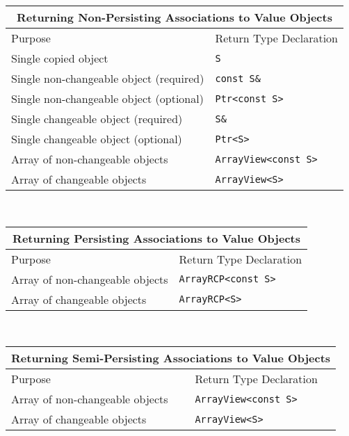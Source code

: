 \begin{tabular}{|l|l|}
%
\multicolumn{2}{c}{\textbf{Returning Non-Persisting Associations to Value Objects}} \\
%
\hline
Purpose
& Return Type Declaration \\
\hline
\hline
Single copied object
& {}\texttt{S} \\
\hline
Single non-changeable object (required)
& {}\texttt{const S\&} \\
\hline
Single non-changeable object (optional)
& {}\texttt{Ptr<const S>} \\
\hline
Single changeable object (required)
& {}\texttt{S\&} \\
\hline
Single changeable object (optional)
& {}\texttt{Ptr<S>} \\
\hline
Array of non-changeable objects
& {}\texttt{ArrayView<const S>} \\
\hline
Array of changeable objects
& {}\texttt{ArrayView<S>} \\
\hline
%
\end{tabular} \\[3ex]
%
\begin{tabular}{|l|l|}
%
\multicolumn{2}{c}{\textbf{Returning Persisting Associations to Value Objects}} \\
%
\hline
Purpose
& Return Type Declaration \\
\hline
\hline
Array of non-changeable objects
& {}\texttt{ArrayRCP<const S>} \\
\hline
Array of changeable objects
& {}\texttt{ArrayRCP<S>} \\
\hline
\end{tabular} \\[3ex]
%
\begin{tabular}{|l|l|}
%
\multicolumn{2}{c}{\textbf{Returning Semi-Persisting Associations to Value Objects}} \\
%
\hline
Purpose
& Return Type Declaration \\
\hline
\hline
Array of non-changeable objects
& {}\texttt{ArrayView<const S>} \\
\hline
Array of changeable objects
& {}\texttt{ArrayView<S>} \\
\hline
\end{tabular}

